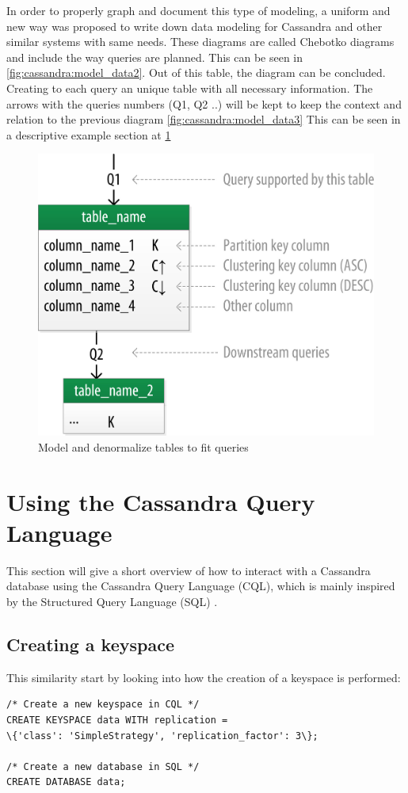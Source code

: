 In order to properly graph and document this type of modeling, a uniform and new way was proposed to write down data modeling for Cassandra and other similar systems with same needs. \autocite{chebotko2015data}
These diagrams are called Chebotko diagrams and include the way queries are planned. This can be seen in \ref{fig:cassandra:model_data2}. 
Out of this table, the diagram can be concluded. Creating to each query an unique table with all necessary information. The arrows with the queries numbers (Q1, Q2 ..) will be kept to keep the context and relation to the previous diagram \ref{fig:cassandra:model_data3}
This can be seen in a descriptive example section at \ref{fig:cassandra:chebotko}

\begin{figure}[H]
    \centering
    \includegraphics[width=0.75\columnwidth]{img/model_example_primary_key.jpeg}
    \caption{Model and denormalize tables to fit queries \autocite{cassandra_oreilly}}
    \label{fig:cassandra:chebotko}
\end{figure}

\section{Using the Cassandra Query Language}  %
This section will give a short overview of how to interact with a Cassandra database using the Cassandra Query Language (CQL), which is mainly inspired by the Structured Query Language (SQL) \autocite{cqlAlexMeng, newInCQL3, cassandra3cqldocCreateKeystore}.

\subsection {Creating a keyspace}
This similarity start by looking into how the creation of a keyspace is performed:
\begin{verbatim}
/* Create a new keyspace in CQL */
CREATE KEYSPACE data WITH replication =
\{'class': 'SimpleStrategy', 'replication_factor': 3\};

/* Create a new database in SQL */
CREATE DATABASE data;
\end{verbatim}

